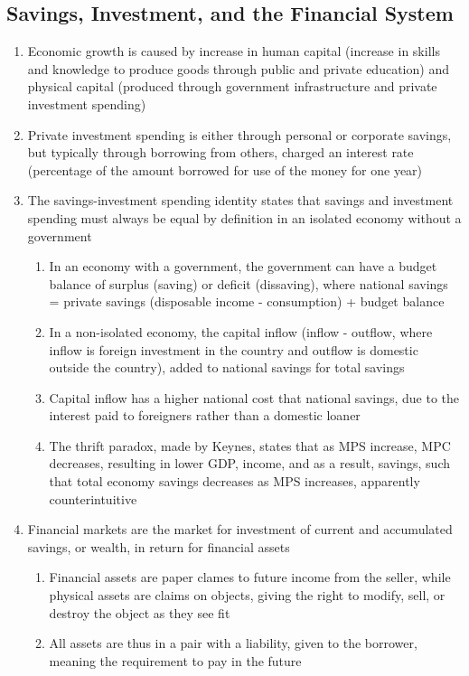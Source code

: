 \subsection{Savings, Investment, and the Financial System}
\begin{enumerate}
\item Economic growth is caused by increase in human capital (increase in skills and knowledge to produce goods through public and private education) and physical capital (produced through government infrastructure and private investment spending)
\item Private investment spending is either through personal or corporate savings, but typically through borrowing from others, charged an interest rate (percentage of the amount borrowed for use of the money for one year)
\item The savings-investment spending identity states that savings and investment spending must always be equal by definition in an isolated economy without a government
\begin{enumerate}
\item In an economy with a government, the government can have a budget balance of surplus (saving) or deficit (dissaving), where national savings = private savings (disposable income - consumption) + budget balance
\item In a non-isolated economy, the capital inflow (inflow - outflow, where inflow is foreign investment in the country and outflow is domestic outside the country), added to national savings for total savings
\item Capital inflow has a higher national cost that national savings, due to the interest paid to foreigners rather than a domestic loaner
\item The thrift paradox, made by Keynes, states that as MPS increase, MPC decreases, resulting in lower GDP, income, and as a result, savings, such that total economy savings decreases as MPS increases, apparently counterintuitive
\end{enumerate}
\item Financial markets are the market for investment of current and accumulated savings, or wealth, in return for financial assets
\begin{enumerate}
\item Financial assets are paper clames to future income from the seller, while physical assets are claims on objects, giving the right to modify, sell, or destroy the object as they see fit
\item All assets are thus in a pair with a liability, given to the borrower, meaning the requirement to pay in the future

\end{enumerate}
\end{enumerate}
